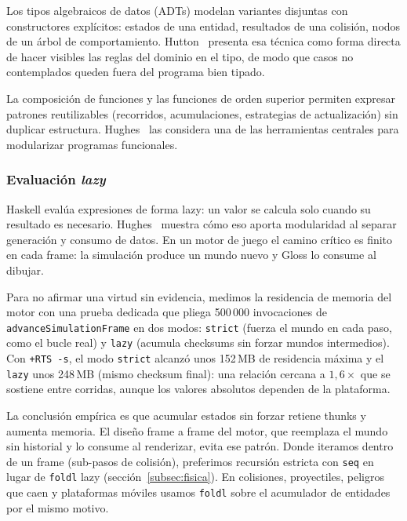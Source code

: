 Los tipos algebraicos de datos (ADTs) modelan variantes disjuntas con constructores
explícitos: estados de una entidad, resultados de una colisión, nodos de un árbol de
comportamiento. Hutton~\cite{hutton2016programming} presenta esa técnica como forma directa
de hacer visibles las reglas del dominio en el tipo, de modo que casos no contemplados
queden fuera del programa bien tipado.

La composición de funciones y las funciones de orden superior permiten expresar patrones
reutilizables (recorridos, acumulaciones, estrategias de actualización) sin duplicar
estructura. Hughes~\cite{hughes1989whyfp} las considera una de las herramientas centrales
para modularizar programas funcionales.

\subsubsection{Evaluación \textit{lazy}}
\label{subsubsec:teoria-lazy}

Haskell evalúa expresiones de forma lazy: un valor se calcula solo cuando su resultado
es necesario. Hughes~\cite{hughes1989whyfp} muestra cómo eso aporta modularidad al separar
generación y consumo de datos. En un motor de juego el camino crítico es finito en cada
frame: la simulación produce un mundo nuevo y Gloss lo consume al dibujar.

Para no afirmar una virtud sin evidencia, medimos la residencia de memoria del motor con
una prueba dedicada que pliega 500\,000 invocaciones de \texttt{advanceSimulationFrame}
en dos modos: \texttt{strict} (fuerza el mundo en cada paso, como el bucle real) y
\texttt{lazy} (acumula checksums sin forzar mundos intermedios). Con \texttt{+RTS -s}, el
modo \texttt{strict} alcanzó unos 152\,MB de residencia máxima y el \texttt{lazy} unos
248\,MB (mismo checksum final): una relación cercana a $1{,}6\times$ que se sostiene entre
corridas, aunque los valores absolutos dependen de la plataforma.

La conclusión empírica es que acumular estados sin forzar retiene thunks y aumenta
memoria. El diseño frame a frame del motor, que reemplaza el mundo sin historial y lo
consume al renderizar, evita ese patrón. Donde iteramos dentro de un frame (sub-pasos de
colisión), preferimos recursión estricta con \texttt{seq} en lugar de \texttt{foldl} lazy
(sección~\ref{subsec:fisica}). En colisiones, proyectiles, peligros que caen y plataformas
móviles usamos \texttt{foldl\textquotesingle} sobre el acumulador de entidades por el
mismo motivo.


